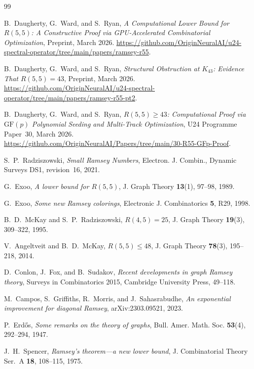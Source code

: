 \documentclass[11pt,a4paper]{article}
\theoremstyle{plain}
\theoremstyle{remark}
\newcommand{\GF}{\mathrm{GF}}
\begin{document}
\begin{thebibliography}{99}

B.~Daugherty, G.~Ward, and S.~Ryan,
\emph{A Computational Lower Bound for $R(5,5)$: A Constructive Proof
via GPU-Accelerated Combinatorial Optimization},
Preprint, March 2026.
\url{https://github.com/OriginNeuralAI/u24-spectral-operator/tree/main/papers/ramsey-r55}.

B.~Daugherty, G.~Ward, and S.~Ryan,
\emph{Structural Obstruction at $K_{43}$: Evidence That $R(5,5) = 43$},
Preprint, March 2026.
\url{https://github.com/OriginNeuralAI/u24-spectral-operator/tree/main/papers/ramsey-r55-pt2}.

B.~Daugherty, G.~Ward, and S.~Ryan,
\emph{$R(5,5) \geq 43$: Computational Proof via $\GF(p)$ Polynomial
Seeding and Multi-Track Optimization},
U24 Programme Paper~30, March 2026.
\url{https://github.com/OriginNeuralAI/Papers/tree/main/30-R55-GFp-Proof}.

S.~P.~Radziszowski,
\emph{Small Ramsey Numbers},
Electron. J. Combin., Dynamic Surveys DS1, revision~16, 2021.

G.~Exoo,
\emph{A lower bound for $R(5,5)$},
J. Graph Theory \textbf{13}(1), 97--98, 1989.

G.~Exoo,
\emph{Some new Ramsey colorings},
Electronic J. Combinatorics \textbf{5}, R29, 1998.

B.~D.~McKay and S.~P.~Radziszowski,
\emph{$R(4,5) = 25$},
J. Graph Theory \textbf{19}(3), 309--322, 1995.

V.~Angeltveit and B.~D.~McKay,
\emph{$R(5,5) \leq 48$},
J. Graph Theory \textbf{78}(3), 195--218, 2014.

D.~Conlon, J.~Fox, and B.~Sudakov,
\emph{Recent developments in graph Ramsey theory},
Surveys in Combinatorics 2015, Cambridge University Press, 49--118.

M.~Campos, S.~Griffiths, R.~Morris, and J.~Sahasrabudhe,
\emph{An exponential improvement for diagonal Ramsey},
arXiv:2303.09521, 2023.

P.~Erd\H{o}s,
\emph{Some remarks on the theory of graphs},
Bull. Amer. Math. Soc. \textbf{53}(4), 292--294, 1947.

J.~H.~Spencer,
\emph{Ramsey's theorem---a new lower bound},
J. Combinatorial Theory Ser.~A \textbf{18}, 108--115, 1975.


\end{thebibliography}
\end{document}
